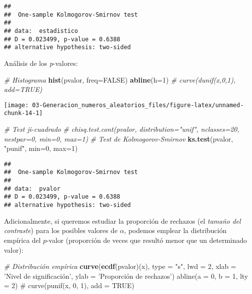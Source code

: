\documentclass[
]{book}
\newenvironment{Shaded}{\begin{snugshade}}{\end{snugshade}}
\newcommand{\CommentTok}[1]{\textcolor[rgb]{0.56,0.35,0.01}{\textit{#1}}}
\newcommand{\DataTypeTok}[1]{\textcolor[rgb]{0.13,0.29,0.53}{#1}}
\newcommand{\DecValTok}[1]{\textcolor[rgb]{0.00,0.00,0.81}{#1}}
\newcommand{\KeywordTok}[1]{\textcolor[rgb]{0.13,0.29,0.53}{\textbf{#1}}}
\newcommand{\NormalTok}[1]{#1}
\newcommand{\OtherTok}[1]{\textcolor[rgb]{0.56,0.35,0.01}{#1}}
\newcommand{\StringTok}[1]{\textcolor[rgb]{0.31,0.60,0.02}{#1}}
\theoremstyle{break}
\theoremstyle{definition}
\theoremstyle{definition}
\theoremstyle{definition}
\theoremstyle{remark}
\begin{document}
\begin{verbatim}
## 
##  One-sample Kolmogorov-Smirnov test
## 
## data:  estadistico
## D = 0.023499, p-value = 0.6388
## alternative hypothesis: two-sided
\end{verbatim}

Análisis de los \emph{p}-valores:

\begin{Shaded}
\begin{Highlighting}[]
\CommentTok{# Histograma}
\KeywordTok{hist}\NormalTok{(pvalor, }\DataTypeTok{freq=}\OtherTok{FALSE}\NormalTok{)}
\KeywordTok{abline}\NormalTok{(}\DataTypeTok{h=}\DecValTok{1}\NormalTok{) }\CommentTok{# curve(dunif(x,0,1), add=TRUE)}
\end{Highlighting}
\end{Shaded}

\begin{center}\texttt{[image: 03-Generacion\_numeros\_aleatorios\_files/figure-latex/unnamed-chunk-14-1]} \end{center}

\begin{Shaded}
\begin{Highlighting}[]
\CommentTok{# Test ji-cuadrado}
\CommentTok{# chisq.test.cont(pvalor, distribution="unif", nclasses=20, nestpar=0, min=0, max=1)}
\CommentTok{# Test de Kolmogorov-Smirnov}
\KeywordTok{ks.test}\NormalTok{(pvalor, }\StringTok{"punif"}\NormalTok{,  }\DataTypeTok{min=}\DecValTok{0}\NormalTok{, }\DataTypeTok{max=}\DecValTok{1}\NormalTok{)}
\end{Highlighting}
\end{Shaded}

\begin{verbatim}
## 
##  One-sample Kolmogorov-Smirnov test
## 
## data:  pvalor
## D = 0.023499, p-value = 0.6388
## alternative hypothesis: two-sided
\end{verbatim}

Adicionalmente, si queremos estudiar la proporción de rechazos (el \emph{tamaño del contraste}) para los posibles valores de \(\alpha\), podemos emplear la distribución empírica del \(p\)-valor (proporción de veces que resultó menor que un determinado valor):

\begin{Shaded}
\begin{Highlighting}[]
\CommentTok{# Distribución empírica}
\KeywordTok{curve}\NormalTok{(}\KeywordTok{ecdf}\NormalTok{(pvalor)(x), }\DataTypeTok{type =} \StringTok{"s"}\NormalTok{, }\DataTypeTok{lwd =} \DecValTok{2}\NormalTok{, }
      \DataTypeTok{xlab =} \StringTok{'Nivel de significación', ylab = '}\NormalTok{Proporción de rechazos}\StringTok{')}
\StringTok{abline(a = 0, b = 1, lty = 2)   # curve(punif(x, 0, 1), add = TRUE)}
\end{Highlighting}
\end{Shaded}
\end{document}
